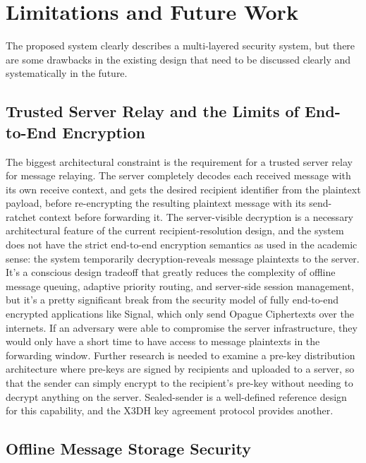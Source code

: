 \documentclass[conference]{IEEEtran}
\begin{document}
\section{Limitations and Future Work}

The proposed system clearly describes a multi-layered security system, but there are some drawbacks in the existing design that need to be discussed clearly and systematically in the future.

\subsection{Trusted Server Relay and the Limits of End-to-End Encryption}

The biggest architectural constraint is the requirement for a trusted server relay for message relaying. The server completely decodes each received message with its own receive context, and gets the desired recipient identifier from the plaintext payload, before re-encrypting the resulting plaintext message with its send-ratchet context before forwarding it. The server-visible decryption is a necessary architectural feature of the current recipient-resolution design, and the system does not have the strict end-to-end encryption semantics as used in the academic sense: the system temporarily decryption-reveals message plaintexts to the server. It's a conscious design tradeoff that greatly reduces the complexity of offline message queuing, adaptive priority routing, and server-side session management, but it's a pretty significant break from the security model of fully end-to-end encrypted applications like Signal, which only send Opague Ciphertexts over the internets. If an adversary were able to compromise the server infrastructure, they would only have a short time to have access to message plaintexts in the forwarding window. Further research is needed to examine a pre-key distribution architecture where pre-keys are signed by recipients and uploaded to a server, so that the sender can simply encrypt to the recipient's pre-key without needing to decrypt anything on the server. Sealed-sender is a well-defined reference design for this capability, and the X3DH key agreement protocol \cite{b6} provides another.

\subsection{Offline Message Storage Security}
\end{document}
